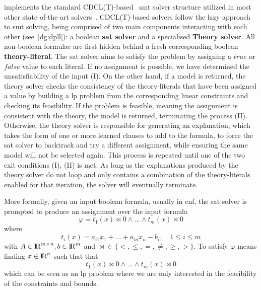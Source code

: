 \documentclass[runningheads]{llncs}
\begin{document}
\dlinear implements the standard CDCL(T)-based~\cite{ref:dpll-t} \gls{smt} solver structure utilized in most other state-of-the-art solvers~\cite{ref:cvc5}.
CDCL(T)-based solvers follow the lazy approach to \gls{smt} solving, being comprised of two main components interacting with each other (see~\autoref{dg:dpll}): a boolean \textbf{\gls{sat} solver} and a specialised \textbf{Theory solver}.
All non-boolean formulae are first hidden behind a fresh corresponding boolean \textbf{theory-literal}.
The \gls{sat} solver aims to satisfy the problem by assigning a $true$ or $false$ value to each literal.
If no assignment is possible, we have determined the unsatisfiability of the input (I).
On the other hand, if a model is returned, the theory solver checks the consistency of the theory-literals that have been assigned a value by building a \gls{lp} problem from the corresponding linear constraints and checking its feasibility.
If the problem is feasible, meaning the assignment is consistent with the theory, the model is returned, terminating the process (II).
Otherwise, the theory solver is responsible for generating an explanation, which takes the form of one or more learned clauses to add to the formula, to force the \gls{sat} solver to backtrack and try a different assignment, while ensuring the same model will not be selected again.
This process is repeated until one of the two exit conditions (I), (II) is met.
As long as the explanations produced by the theory solver do not loop and only contains a combination of the theory-literals enabled for that iteration, the solver will eventually terminate.


More formally, given an input boolean formula, usually in \gls{cnf}, the \gls{sat} solver is prompted to produce an assignment over the input formula
\begin{equation} %
    \label{eq:smt-formula}
    \varphi = t_1(x) \bowtie 0 \wedge \ldots \wedge t_m (x) \bowtie 0
\end{equation}
where
\begin{equation*}
    t_i(x) = a_{i1}x_1 + \ldots + a_{in}x_n - b_i, \quad 1 \le i \le m
\end{equation*}
with $A \in {\rm I\!R}^{m \times n}, b \in {\rm I\!R}^m$ and $\bowtie \in \{<, \le, =, \ne, \ge, >\}$.
To satisfy $\varphi$ means finding $x \in {\rm I\!R}^n $ such that that
\begin{equation*}
    t_1(x) \bowtie 0 \wedge \ldots \wedge t_m(x) \bowtie 0
\end{equation*}
which can be seen as an \gls{lp} problem where we are only interested in the feasibility of the constraints and bounds.
\end{document}
